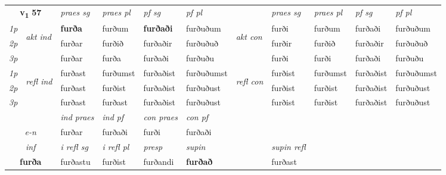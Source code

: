 \noindent
\begin{tabular}{lllllllllll} \toprule
\multicolumn{2}{c}{\textbf{v{\textsubscript{1}}} \Large{\textbf{57}}}  &  \textit{praes sg}  & \textit{praes pl}  &\textit{ pf sg} & \textit{pf pl} &  &  \textit{praes sg}  & \textit{praes pl}  & \textit{pf sg} & \textit{pf pl } \\*
	\cmidrule{3-6} \cmidrule{8-11}
 {\textit{1p}} & \multirow{3}{*}{\begin{turn}{90}\textit{akt ind}\end{turn}} & \textbf{furða} & furðum & \textbf{furðaði} & furðuðum & \multirow{3}{*}{\begin{turn}{90}\textit{akt con}\end{turn}} &furði & furðum & furðaði & furðuðum\\*
 {\textit{2p}} &  &  furðar  & furðið & furðaðir & furðuðuð & & furðir & furðið & furðaðir & furðuðuð \\*
{\textit{3p}} &  & furðar & furða & furðaði & furðuðu & & furði & furði& furðaði & furðuðu \\*
\cmidrule{3-6} \cmidrule{8-11}
 {\textit{1p}} & \multirow{3}{*}{\begin{turn}{90}\textit{refl ind}\end{turn}}  & furðast & furðumst & furðaðist & furðuðumst & \multirow{3}{*}{\begin{turn}{90}\textit{refl con}\end{turn}}  &furðist & furðumst & furðaðist & furðuðumst \\*
 {\textit{2p}} &  & furðast & furðist & furðaðist & furðuðust & &furðist & furðist & furðaðist & furðuðust \\*
 {\textit{3p}}  & & furðast & furðast & furðaðist & furðuðust & & furðist & furðist& furðaðist & furðuðust \\*
\cmidrule{3-6} \cmidrule{8-11}

   & &  \textit{ind praes} & \textit{ind pf} & \textit{con praes} & \textit{con pf} \\*
\multicolumn{2}{c}{ \textit{e-n} } & furðar & furðaði & furði & furðaði \\*

\cmidrule{3-8}
   \multicolumn{2}{c}{\textit{inf}}   & \textit{i refl sg} & \textit{i refl pl} & \textit{presp} & \textit{supin} && \textit{supin refl}  \\*
  \multicolumn{2}{c}{\textbf{furða}}    & furðastu & furðist & furðandi &  \textbf{furðað} && furðast  \\*
\end{tabular}


